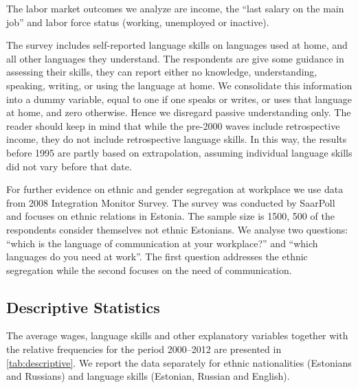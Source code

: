 \documentclass[12pt, a4paper]{article}
\begin{document}
The labor market outcomes we analyze are income, the ``last salary on the main job'' and
labor force status (working, unemployed or inactive).  

The survey includes self-reported language skills on languages used at
home, and all other languages they understand.  The respondents are
give some guidance in assessing their skills, they can report either
no knowledge, understanding, speaking, writing, or using the
language at home.  We consolidate this information into a dummy variable, equal
to one if one speaks or writes, or uses that language at
home, and zero otherwise.  Hence we disregard passive understanding
only.
  The reader should keep in mind that while the pre-2000 waves include retrospective income, they do not include retrospective language skills. In this way, the results before
1995 are partly based on extrapolation, assuming individual language
skills did not vary before that date.

For further evidence on ethnic and gender segregation at workplace we use data
from 2008 Integration Monitor Survey.  The survey was conducted by
SaarPoll and focuses on
ethnic relations in Estonia.  The sample size is 1500,
500 of the respondents consider themselves not ethnic Estonians.  We analyse
two questions: ``which is the language of communication at your
workplace?'' and ``which languages do you need at work''.  The first
question addresses the ethnic segregation while the second focuses on
the need of communication.


\subsection{Descriptive Statistics}
\label{sec:descriptive}

The average wages, language skills and other explanatory variables together with the relative frequencies for the period 2000--2012 are presented in \cref{tab:descriptive}. We report the data separately for ethnic nationalities (Estonians and Russians) and language
skills (Estonian, Russian and English).
\end{document}
